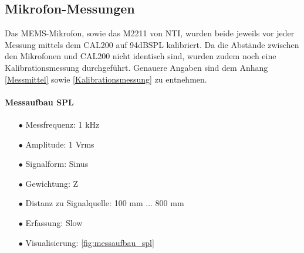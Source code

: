 \documentclass[12pt]{article}
\begin{document}
	\subsection{Mikrofon-Messungen}
	Das MEMS-Mikrofon, sowie das M2211 von NTI, wurden beide jeweils vor jeder Messung mittels dem CAL200 auf 94dBSPL kalibriert. Da die Abstände zwischen den Mikrofonen und CAL200 nicht identisch sind, wurden zudem noch eine Kalibrationsmessung durchgeführt. Genauere Angaben sind dem Anhang \ref{Messmittel} sowie \ref{Kalibrationsmessung} zu entnehmen.
	\paragraph{Messaufbau SPL}
		\begin{itemize}[topsep=10pt,partopsep=0pt,labelwidth=5cm,align=left,itemindent=5cm]
		\item[$\bullet$ Messfrequenz:] 1 kHz
		\item[$\bullet$ Amplitude:]  1 Vrms
		\item[$\bullet$ Signalform:]  Sinus
		\item[$\bullet$ Gewichtung:]  Z
		\item[$\bullet$ Distanz zu Signalquelle:]  100 mm ... 800 mm
		\item[$\bullet$ Erfassung:]  Slow
		\item[$\bullet$ Visualisierung:]  \ref{fig:messaufbau_spl}
	\end{itemize}
\end{document}
